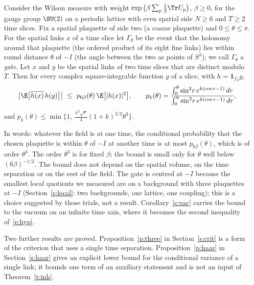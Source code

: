 \begin{theorem}\label{t:ret}
Consider the Wilson measure with weight $\exp\big(\beta\sum_p\tfrac12\Tr U_p\big)$, $\beta\ge0$, for the gauge
group $\SU(2)$ on a periodic lattice with even spatial side $N\ge6$ and $T\ge2$ time slices. Fix a spatial
plaquette of side two (a coarse plaquette) and $0\le\theta\le\pi$. For the spatial links $x$ of a time slice
let $\Gamma_\theta$ be the event that the holonomy around that plaquette (the ordered product of its eight fine
links) lies within round distance $\theta$ of $-I$ (the angle between the two as points of $S^3$); we call
$\Gamma_\theta$ a \emph{gate}. Let $x$ and $y$ be the spatial links of two time slices that are distinct modulo $T$. Then for every
complex square-integrable function $g$ of a slice, with $h=\mathbf 1_{\Gamma_\theta}g$,
\begin{equation}\label{e:ret}
\big|\E\big[\overline{h(x)}\,h(y)\big]\big|\ \le\ p_{6\beta}(\theta)\,\E\big[|h(x)|^2\big],
\qquad
p_k(\theta)=\frac{\int_0^\theta\sin^2\!r\,e^{k(\cos r-1)}\,dr}{\int_0^\pi\sin^2\!r\,e^{k(\cos r-1)}\,dr},
\end{equation}
and $p_k(\theta)\le\min\{1,\ \tfrac{\pi^2\sqrt e}{4}(1+k)^{3/2}\theta^3\}$.
\end{theorem}

In words: whatever the field is at one time, the conditional probability that the chosen plaquette is within
$\theta$ of $-I$ at another time is at most $p_{6\beta}(\theta)$, which is of order $\theta^3$. The order $\theta^3$ is for
fixed $\beta$; the bound is small only for $\theta$ well below $(6\beta)^{-1/2}$. The bound does not
depend on the spatial volume, on the time separation or on the rest of the field. The gate is centred at $-I$ because the smallest local quotients we measured are
on a background with three plaquettes at $-I$ (Section~\ref{s:local}: two backgrounds, one lattice, one
coupling); this is a choice suggested by those trials, not a result. Corollary~\ref{c:vac} carries the bound to the vacuum on an
infinite time axis, where it becomes the second inequality of~\eqref{e:hyp}.

Two further results are proved. Proposition~\ref{p:three} in Section~\ref{s:crit} is a form of the criterion
that uses a single time separation. Proposition~\ref{p:haar} in Section~\ref{s:haar} gives an explicit lower
bound for the conditional variance of a single link; it bounds one term of an auxiliary statement and is not
an input of Theorem~\ref{t:inh}.

